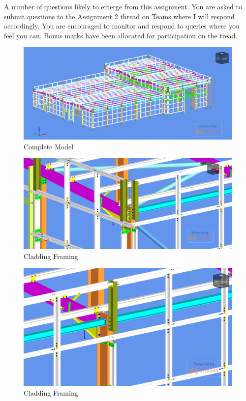 A number of questions likely to emerge from this assignment.  You are asked to submit questions to the Assignment 2 thread on Teams where I will respond accordingly.  You are encouraged to monitor and respond to queries where you feel you can.  Bonus marks have been allocated for participation on the tread.




\begin{figure}
	\centering
	\includegraphics[width=1.0\linewidth]{./images/1.png}
	\caption{Complete Model}
	\label{fig:ass3img1}
\end{figure}

\begin{figure}
	\centering
	\includegraphics[width=1.0\linewidth]{./images/2.png}
	\caption{Cladding Framing}
	\label{fig:ass3img2}
\end{figure}

\begin{figure}
	\centering
	\includegraphics[width=1.0\linewidth]{./images/3.png}
	\caption{Cladding Framing}
	\label{fig:ass3img3}
\end{figure}

